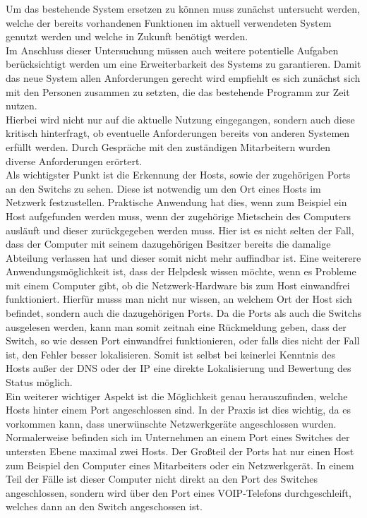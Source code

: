 Um das bestehende System ersetzen zu können muss zunächst untersucht werden, welche der bereits vorhandenen Funktionen im aktuell verwendeten System genutzt werden und welche in Zukunft benötigt werden.\\
Im Anschluss dieser Untersuchung müssen auch weitere potentielle Aufgaben berücksichtigt werden um eine Erweiterbarkeit des Systems zu garantieren.
Damit das neue System allen Anforderungen gerecht wird empfiehlt es sich zunächst sich mit den Personen zusammen zu setzten, die das bestehende Programm zur Zeit nutzen.\\
Hierbei wird nicht nur auf die aktuelle Nutzung eingegangen, sondern auch diese kritisch hinterfragt, ob eventuelle Anforderungen bereits von anderen Systemen erfüllt werden.
Durch Gespräche mit den zuständigen Mitarbeitern wurden diverse Anforderungen erörtert.\\
Als wichtigster Punkt ist die Erkennung der Hosts, sowie der zugehörigen Ports an den Switchs zu sehen.
Diese ist notwendig um den Ort eines Hosts im Netzwerk festzustellen. Praktische Anwendung hat dies, wenn zum Beispiel ein Host aufgefunden werden muss, wenn der zugehörige Mietschein des Computers ausläuft und dieser zurückgegeben werden muss.
Hier ist es nicht selten der Fall, dass der Computer mit seinem dazugehörigen Besitzer bereits die damalige Abteilung verlassen hat und dieser somit nicht mehr auffindbar ist.
Eine weiterere Anwendungsmöglichkeit ist, dass der Helpdesk wissen möchte, wenn es Probleme mit einem Computer gibt, ob die Netzwerk-Hardware bis zum Host einwandfrei funktioniert. Hierfür musss man nicht nur wissen, an welchem Ort der Host sich befindet, sondern auch die dazugehörigen Ports.
Da die Ports als auch die Switchs ausgelesen werden, kann man somit zeitnah eine Rückmeldung geben, dass der Switch, so wie dessen Port einwandfrei funktionieren, oder falls dies nicht der Fall ist, den Fehler besser lokalisieren. Somit ist selbst bei keinerlei Kenntnis des Hosts außer der DNS oder der IP eine direkte Lokalisierung und Bewertung des Status möglich.\\
Ein weiterer wichtiger Aspekt ist die Möglichkeit genau herauszufinden, welche Hosts hinter einem Port angeschlossen sind.
In der Praxis ist dies wichtig, da es vorkommen kann, dass unerwünschte Netzwerkgeräte angeschlossen wurden.
Normalerweise befinden sich im Unternehmen an einem Port eines Switches der untersten Ebene maximal zwei Hosts. Der Großteil der Ports hat nur einen Host zum Beispiel den Computer eines Mitarbeiters oder ein Netzwerkgerät. In einem Teil der Fälle ist dieser Computer nicht direkt an den Port des Switches angeschlossen, sondern wird über den Port eines VOIP-Telefons durchgeschleift, welches dann an den Switch angeschossen ist.
